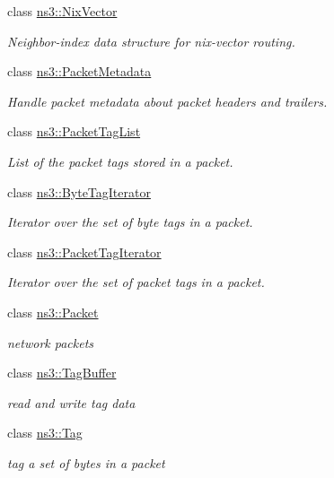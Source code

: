 \begin{DoxyCompactItemize}
class \hyperlink{classns3_1_1NixVector}{ns3\+::\+Nix\+Vector}
\begin{DoxyCompactList}\small\item\em Neighbor-\/index data structure for nix-\/vector routing. \end{DoxyCompactList}\item 
class \hyperlink{classns3_1_1PacketMetadata}{ns3\+::\+Packet\+Metadata}
\begin{DoxyCompactList}\small\item\em Handle packet metadata about packet headers and trailers. \end{DoxyCompactList}\item 
class \hyperlink{classns3_1_1PacketTagList}{ns3\+::\+Packet\+Tag\+List}
\begin{DoxyCompactList}\small\item\em List of the packet tags stored in a packet. \end{DoxyCompactList}\item 
class \hyperlink{classns3_1_1ByteTagIterator}{ns3\+::\+Byte\+Tag\+Iterator}
\begin{DoxyCompactList}\small\item\em Iterator over the set of byte tags in a packet. \end{DoxyCompactList}\item 
class \hyperlink{classns3_1_1PacketTagIterator}{ns3\+::\+Packet\+Tag\+Iterator}
\begin{DoxyCompactList}\small\item\em Iterator over the set of packet tags in a packet. \end{DoxyCompactList}\item 
class \hyperlink{classns3_1_1Packet}{ns3\+::\+Packet}
\begin{DoxyCompactList}\small\item\em network packets \end{DoxyCompactList}\item 
class \hyperlink{classns3_1_1TagBuffer}{ns3\+::\+Tag\+Buffer}
\begin{DoxyCompactList}\small\item\em read and write tag data \end{DoxyCompactList}\item 
class \hyperlink{classns3_1_1Tag}{ns3\+::\+Tag}
\begin{DoxyCompactList}\small\item\em tag a set of bytes in a packet \end{DoxyCompactList}\item 

\end{DoxyCompactItemize}

